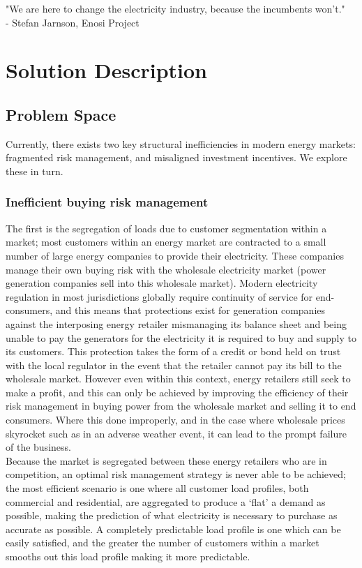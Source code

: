 \documentclass{article}
\theoremstyle{definition}
\theoremstyle{plain} %
\begin{document}
\noindent "We are here to change the electricity industry, because the incumbents won’t."\\
- Stefan Jarnson, Enosi Project




\pagebreak
\section{Solution Description}

\subsection{Problem Space}

Currently, there exists two key structural inefficiencies in modern energy markets: fragmented risk management, and misaligned investment incentives. We explore these in turn.

\subsubsection{Inefficient buying risk management}

The first is the segregation of loads due to customer segmentation within a market; most customers within an energy market are contracted to a small number of large energy companies to provide their electricity. These companies manage their own buying risk with the wholesale electricity market (power generation companies sell into this wholesale market). Modern electricity regulation in most jurisdictions globally require continuity of service for end-consumers, and this means that protections exist for generation companies against the interposing energy retailer mismanaging its balance sheet and being unable to pay the generators for the electricity it is required to buy and supply to its customers. This protection takes the form of a credit or bond held on trust with the local regulator in the event that the retailer cannot pay its bill to the wholesale market. However even within this context, energy retailers still seek to make a profit, and this can only be achieved by improving the efficiency of their risk management in buying power from the wholesale market and selling it to end consumers. Where this done improperly, and in the case where wholesale prices skyrocket such as in an adverse weather event, it can lead to the prompt failure of the business.\\

\noindent Because the market is segregated between these energy retailers who are in competition, an optimal risk management strategy is never able to be achieved; the most efficient scenario is one where all customer load profiles, both commercial and residential, are aggregated to produce a ‘flat’ a demand as possible, making the prediction of what electricity is necessary to purchase as accurate as possible. A completely predictable load profile is one which can be easily satisfied, and the greater the number of customers within a market smooths out this load profile making it more predictable.
\end{document}
